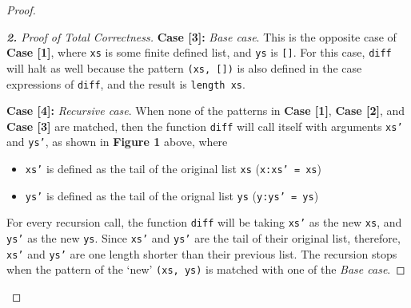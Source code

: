 \documentclass[12pt]{article}
\newcommand{\haskell}{\texttt}
\begin{document}
\begin{proof}
\begin{proof}[\textbf{2.} Proof of Total Correctness]
\bigskip\par\noindent \textbf{Case [3]:} \emph{Base case}. This is the opposite case of \textbf{Case [1]}, where \haskell{xs} is some finite defined list, and \haskell{ys} is \haskell{[]}. For this case, \haskell{diff} will halt as well because the pattern \haskell{(xs, [])} is also defined in the case expressions of \haskell{diff}, and the result is \haskell{length xs}.

\bigskip\par\noindent \textbf{Case [4]:} \emph{Recursive case}. When none of the patterns in \textbf{Case [1]}, \textbf{Case [2]}, and \textbf{Case [3]} are matched, then the function \haskell{diff} will call itself with arguments \haskell{xs'} and \haskell{ys'}, as shown in \textbf{Figure 1} above, where
\begin{itemize}
    \item \haskell{xs'} is defined as the tail of the original list \haskell{xs} (\haskell{x:xs' = xs})
    \item \haskell{ys'} is defined as the tail of the orignal list \haskell{ys} (\haskell{y:ys' = ys})
\end{itemize}
For every recursion call, the function \haskell{diff} will be taking \haskell{xs'} as the new \haskell{xs}, and \haskell{ys'} as the new \haskell{ys}. Since \haskell{xs'} and \haskell{ys'} are the tail of their original list, therefore, \haskell{xs'} and \haskell{ys'} are one length shorter than their previous list. The recursion stops when the pattern of the `new' \haskell{(xs, ys)} is matched with one of the \emph{Base case}.


\end{proof}
\end{proof}
\end{document}
